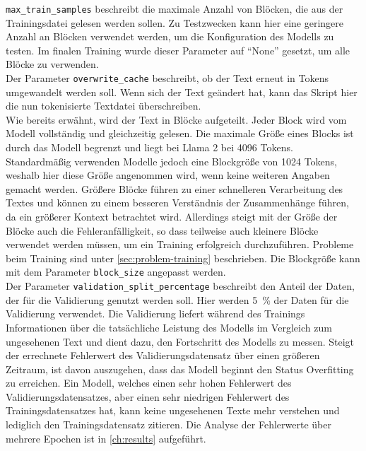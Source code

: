 \texttt{max\_train\_samples} beschreibt die maximale Anzahl von Blöcken, die aus der Trainingsdatei gelesen werden sollen.
Zu Testzwecken kann hier eine geringere Anzahl an Blöcken verwendet werden, um die Konfiguration des Modells zu testen.
Im finalen Training wurde dieser Parameter auf \enquote{None} gesetzt, um alle Blöcke zu verwenden.\\

Der Parameter \texttt{overwrite\_cache} beschreibt, ob der Text erneut in Tokens umgewandelt werden soll.
Wenn sich der Text geändert hat, kann das Skript hier die nun tokenisierte Textdatei überschreiben.\\

Wie bereits erwähnt, wird der Text in Blöcke aufgeteilt.
Jeder Block wird vom Modell vollständig und gleichzeitig gelesen.
Die maximale Größe eines Blocks ist durch das Modell begrenzt und liegt bei Llama 2 bei 4096 Tokens.
Standardmäßig verwenden Modelle jedoch eine Blockgröße von 1024 Tokens, weshalb hier diese Größe angenommen wird, wenn keine weiteren Angaben gemacht werden.
Größere Blöcke führen zu einer schnelleren Verarbeitung des Textes und können zu einem besseren Verständnis der Zusammenhänge führen, da ein größerer Kontext betrachtet wird.
Allerdings steigt mit der Größe der Blöcke auch die Fehleranfälligkeit, so dass teilweise auch kleinere Blöcke verwendet werden müssen, um ein Training erfolgreich durchzuführen.
Probleme beim Training sind unter \cref{sec:problem-training} beschrieben.
Die Blockgröße kann mit dem Parameter \texttt{block\_size} angepasst werden.\\

Der Parameter \texttt{validation\_split\_percentage} beschreibt den Anteil der Daten, der für die Validierung genutzt werden soll.
Hier werden \SI{5}{\percent} der Daten für die Validierung verwendet.
Die Validierung liefert während des Trainings Informationen über die tatsächliche Leistung des Modells im Vergleich zum ungesehenen Text und dient dazu, den Fortschritt des Modells zu messen.
Steigt der errechnete Fehlerwert des Validierungsdatensatz über einen größeren Zeitraum, ist davon auszugehen, dass das Modell beginnt den Status Overfitting zu erreichen.
Ein Modell, welches einen sehr hohen Fehlerwert des Validierungsdatensatzes, aber einen sehr niedrigen Fehlerwert des Trainingsdatensatzes hat, kann keine ungesehenen Texte mehr verstehen und lediglich den Trainingsdatensatz zitieren.
Die Analyse der Fehlerwerte über mehrere Epochen ist in \cref{ch:results} aufgeführt.\\

